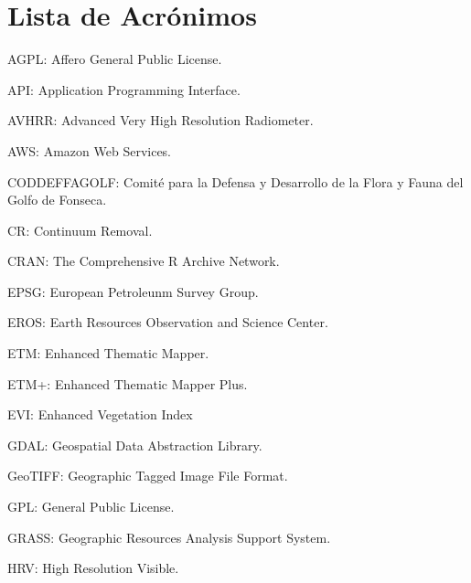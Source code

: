 


\chapter*{Lista de Acrónimos}

AGPL: Affero General Public License.

API: Application Programming Interface.

AVHRR: Advanced Very High Resolution Radiometer.

AWS: Amazon Web Services.

CODDEFFAGOLF: Comité para la Defensa y Desarrollo de la Flora y Fauna del Golfo de Fonseca.

CR: Continuum Removal.

CRAN: The Comprehensive R Archive Network.

EPSG: European Petroleunm Survey Group.

EROS: Earth Resources Observation and Science Center.

ETM: Enhanced Thematic Mapper.

ETM+: Enhanced Thematic Mapper Plus.

EVI: Enhanced Vegetation Index

GDAL: Geospatial Data Abstraction Library.

GeoTIFF: Geographic Tagged Image File Format.

GPL: General Public License.

GRASS: Geographic Resources Analysis Support System.

HRV: High Resolution Visible.

